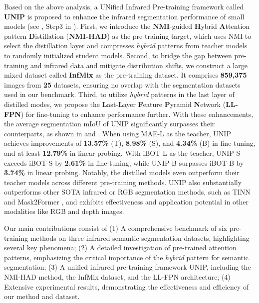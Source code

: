 Based on the above analysis, a UNified Infrared Pre-training framework called \textbf{UNIP} is proposed to enhance the infrared segmentation performance of small models (see , Step3 in ). First, we introduce the \textbf{NMI}-guided \textbf{H}ybrid \textbf{A}ttention pattern \textbf{D}istillation (\textbf{NMI-HAD}) as the pre-training target, which uses NMI to select the distillation layer and compresses \textit{hybrid} patterns from teacher models to randomly initialized student models. Second, to bridge the gap between pre-training and infrared data and mitigate distribution shifts, we construct a large mixed dataset called \textbf{InfMix} as the pre-training dataset. It comprises \textbf{859,375} images from \textbf{25} datasets, ensuring no overlap with the segmentation datasets used in our benchmark. Third, to utilize \textit{hybrid} patterns in the last layer of distilled modes, we propose the \textbf{L}ast-\textbf{L}ayer \textbf{F}eature \textbf{P}yramid \textbf{N}etwork (\textbf{LL-FPN}) for fine-tuning to enhance performance further. 
With these enhancements, the average segmentation mIoU of UNIP significantly surpasses their counterparts, as shown in  and . When using MAE-L \citep{mae} as the teacher, UNIP achieves improvements of \textbf{13.57\%} (T), \textbf{8.98\%} (S), and \textbf{4.34\%} (B) in fine-tuning, and at least \textbf{12.79\%} in linear probing. With iBOT-L \citep{iBOT} as the teacher, UNIP-S exceeds iBOT-S by \textbf{2.61\%} in fine-tuning, while UNIP-B surpasses iBOT-B by \textbf{3.74\%} in linear probing. Notably, the distilled models even outperform their teacher models across different pre-training methods. UNIP also substantially outperforms other SOTA infrared or RGB segmentation methods, such as TINN \citep{tinn} and Mask2Former \citep{mask2former}, and exhibits effectiveness and application potential in other modalities like RGB and depth images.


Our main contributions consist of (1) A comprehensive benchmark of six pre-training methods on three infrared semantic segmentation datasets, highlighting several key phenomena; (2) A detailed investigation of pre-trained attention patterns, emphasizing the critical importance of the \textit{hybrid} pattern for semantic segmentation; (3) A unified infrared pre-training framework UNIP,  including the NMI-HAD method, the InfMix dataset, and the LL-FPN architecture; (4) Extensive experimental results, demonstrating the effectiveness and efficiency of our method and dataset.